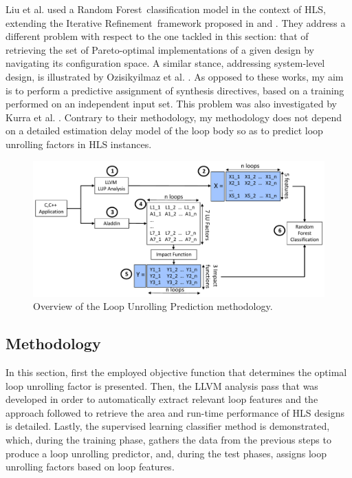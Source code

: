 \documentclass[]{usiinfthesis}
\newcommand{\RF}{{Random Forest}}
\newcommand{\ItRef}{{Iterative Refinement}}
\begin{document}
Liu et al.  \cite{LiuJun13} used a \RF\
classification model in the context of HLS, extending the \ItRef\
framework proposed in \cite{MarianiApr12} \cite{PalermoNov09}
\cite{XydisMar13} and \cite{ZuluagaJun12}. They address a different
problem with respect to the one tackled in this section: that of retrieving the set of
Pareto-optimal implementations of a given design by navigating its
configuration space. A similar stance, addressing system-level design,
is illustrated by Ozisikyilmaz et al. \cite{OzisikyilmazJun08}.  As
opposed to these works, my aim is to perform a predictive assignment
of synthesis directives, based on a training performed on an independent
input set. This problem was also investigated by Kurra et
al. \cite{KurraApr07}. Contrary to their methodology, my methodology does not
depend on a detailed estimation delay model of the loop body so as to
predict loop unrolling factors in HLS instances.

\begin{figure}[h!]
\centering
\includegraphics[width= 1 \linewidth]{figs/LUP_method}
\caption{Overview of the Loop Unrolling Prediction methodology.}
\label{fig:lup_method}
\end{figure}

\subsection{Methodology}
\label{sec:ml_meth}

In this section, first the employed objective function that determines the optimal loop 
unrolling factor is presented.
Then, the LLVM analysis pass that was developed in order to 
automatically extract relevant loop features and the approach followed to retrieve the 
area and run-time performance of HLS designs is detailed. Lastly, the supervised learning 
classifier method is demonstrated, which, during the training phase, gathers the data from the 
previous steps to produce a loop unrolling predictor, and, during the test phases, assigns 
loop unrolling factors based on loop features.\par
\end{document}
